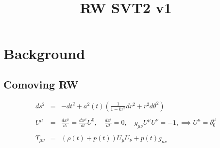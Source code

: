 \documentclass[10pt,letterpaper]{article}
\title{RW SVT2 v1}
\date{}
\numberwithin{equation}{section}
\begin{document}
 
\maketitle
\noindent 
\section{Background}
%
\subsection{Comoving RW}
\begin{eqnarray}
ds^2 &=& -dt^2 + a^2(t)\left( \frac{1}{1-kr^2}dr^2 + r^2d\theta^2 \right)
\\ \nonumber\\
U^\mu &=& \frac{dx^\mu}{d\tau} =  \frac{dx^\mu}{dt}U^0,\quad \frac{dx^i}{dt}=0,\quad g_{\mu\nu}U^\mu U^\nu = -1, \implies U^\mu = \delta^\mu_0
\\ \nonumber\\
T_{\mu\nu} &=& (\rho(t)+p(t))U_\mu U_\nu + p(t)g_{\mu\nu}
\end{eqnarray}
%
\end{document}
